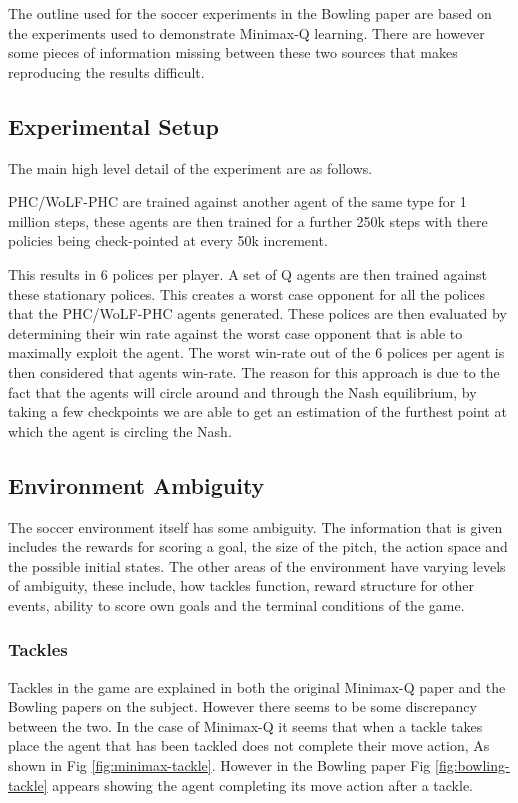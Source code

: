 \documentclass{article}
\begin{document}
The outline used for the soccer experiments in the Bowling paper are based on the experiments used to demonstrate Minimax-Q learning. There are however some pieces of information missing between these two sources that makes reproducing the results difficult. 

\subsection*{Experimental Setup}

The main high level detail of the experiment are as follows.

PHC/WoLF-PHC are trained against another agent of the same type for 1 million steps, these agents are then trained for a further 250k steps with there policies being check-pointed at every 50k increment.

This results in 6 polices per player. A set of Q agents are then trained against these stationary polices. This creates a worst case opponent for all the polices that the PHC/WoLF-PHC agents generated. These polices are then evaluated by determining their win rate against the worst case opponent that is able to maximally exploit the agent. The worst win-rate out of the 6 polices per agent is then considered that agents win-rate. The reason for this approach is due to the fact that the agents will circle around and through the Nash equilibrium, by taking a few checkpoints we are able to get an estimation of the furthest point at which the agent is circling the Nash. 

\subsection*{Environment Ambiguity}

The soccer environment itself has some ambiguity. The information that is given includes the rewards for scoring a goal, the size of the pitch, the action space and the possible initial states. The other areas of the environment have varying levels of ambiguity, these include, how tackles function, reward structure for other events, ability to score own goals and the terminal conditions of the game.

\subsubsection*{Tackles}

Tackles in the game are explained in both the original Minimax-Q paper and the Bowling papers on the subject. However there seems to be some discrepancy between the two. In the case of Minimax-Q it seems that when a tackle takes place the agent that has been tackled does not complete their move action, As shown in Fig \ref{fig:minimax-tackle}. However in the Bowling paper Fig \ref{fig:bowling-tackle} appears showing the agent completing its move action after a tackle. 
\end{document}
